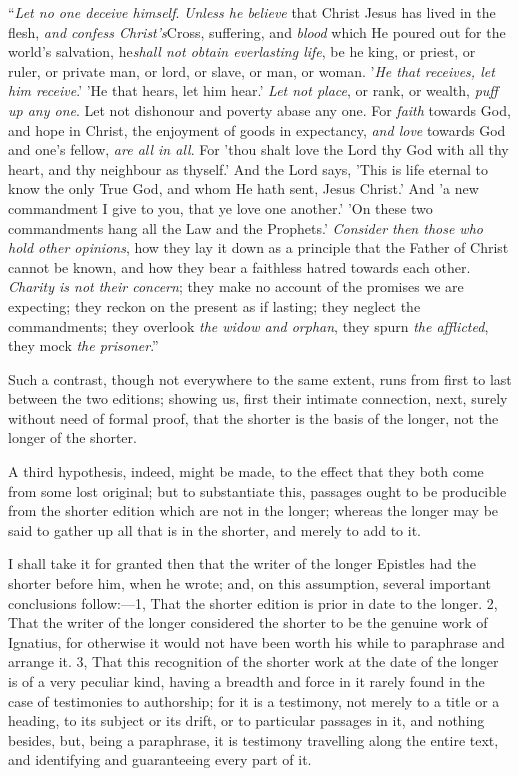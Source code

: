 ``\emph{Let
no one deceive himself}. \emph{Unless he believe} that Christ Jesus
has lived in the flesh, \emph{and confess Christ's}Cross,
suffering, and \emph{blood} which He poured out for the world's
salvation, he\emph{shall not obtain everlasting life}, be he king, or
priest, or ruler, or private man, or lord, or slave, or man, or woman.
'\emph{He that receives, let him receive}.' 'He that hears, let him
hear.' \emph{Let not place}, or rank, or wealth, \emph{puff up any one}.
Let not dishonour and poverty abase any one. For \emph{faith} towards
God, and hope in Christ, the enjoyment of goods in expectancy, \emph{and
love} towards God and one's fellow, \emph{are all in all}. For
'thou shalt love the Lord thy God with all thy heart, and thy
neighbour as thyself.' And the Lord says, 'This is life eternal to
know the only True God, and whom He hath sent, Jesus Christ.' And 'a
new commandment I give to you, that ye love one another.' 'On these
two commandments hang all the Law and the Prophets.' \emph{Consider then
those who hold other opinions}, how they lay it down as a principle
that the Father of Christ cannot be known, and how they bear a
faithless hatred towards each other. \emph{Charity is not their concern};
they make no account of the promises we are expecting; they reckon on
the present as if lasting; they neglect the commandments; they
overlook \emph{the widow and orphan}, they spurn \emph{the afflicted},
they mock \emph{the prisoner}.''

Such a contrast, though not
everywhere to the same extent, runs from first to last between the two
editions; showing us, first their intimate connection, next, surely
without need of formal proof, that the shorter is the basis of the
longer, not the longer of the shorter.

A third hypothesis, indeed,
might be made, to the effect that they both come from some lost
original; but to substantiate this, passages ought to be producible
from the shorter edition which are not in the longer; whereas the
longer may be said to gather up all that is in the shorter, and merely
to add to it.

I shall take it for granted
then that the writer of the longer Epistles had the shorter before
him, when he wrote; and, on this assumption, several important
conclusions follow:—1, That the shorter edition is prior in date to
the longer. 2, That the writer of the longer considered the shorter to
be the genuine work of Ignatius, for otherwise it would not have been
worth his while to paraphrase and arrange it. 3, That this recognition
of the shorter work at the date of the longer is of a very peculiar
kind, having a breadth and force in it rarely found in the case of
testimonies to authorship; for it is a testimony, not merely to a
title or a heading, to its subject or its drift, or to particular
passages in it, and nothing besides, but, being a paraphrase, it is
testimony travelling along the entire text, and identifying and
guaranteeing every part of it.


